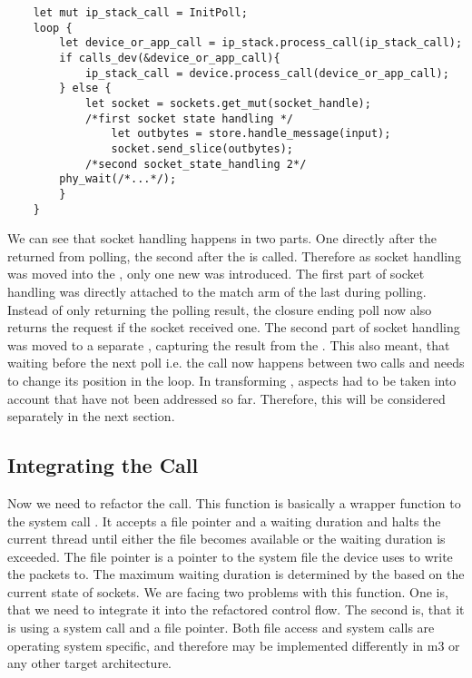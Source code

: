 \begin{verbatim}
    let mut ip_stack_call = InitPoll;
    loop {
        let device_or_app_call = ip_stack.process_call(ip_stack_call);
        if calls_dev(&device_or_app_call){
            ip_stack_call = device.process_call(device_or_app_call);
        } else {
            let socket = sockets.get_mut(socket_handle);
            /*first socket state handling */
                let outbytes = store.handle_message(input);
                socket.send_slice(outbytes);
            /*second socket_state_handling 2*/
        phy_wait(/*...*/);
        }
    }
\end{verbatim}
We can see that socket handling happens in two parts. One directly after the \stack{} returned from polling, the second after the \store{} is called. Therefore as socket handling was moved into the \stack{}, only one new  was introduced. The first part of socket handling was directly attached to the match arm of the last  during polling. Instead of only returning the polling result, the closure ending poll now also returns the request if the socket received one. The second part of socket handling was moved to a separate , capturing the result from the \store{}. This also meant, that waiting before the next poll i.e. the  call now happens between two \stack{} calls and needs to change its position in the loop. In transforming , aspects had to be taken into account that have not been addressed so far. Therefore, this will be considered separately in the next section.

\subsection{Integrating the  Call}
Now we need to refactor the  call. This function is basically a wrapper function to the system call . It accepts a file pointer and a waiting  duration and halts the current thread until either the file becomes available or the waiting duration is exceeded. The file pointer is a pointer to the system file the device uses to write the packets to. The maximum waiting duration is determined by the  based on the current state of sockets. We are facing two problems with this function. One is, that we need to integrate it into the refactored control flow. The second is, that it is using a system call and a file pointer. Both file access and system calls are operating system specific, and therefore may be implemented differently in m3 or any other target architecture. 

